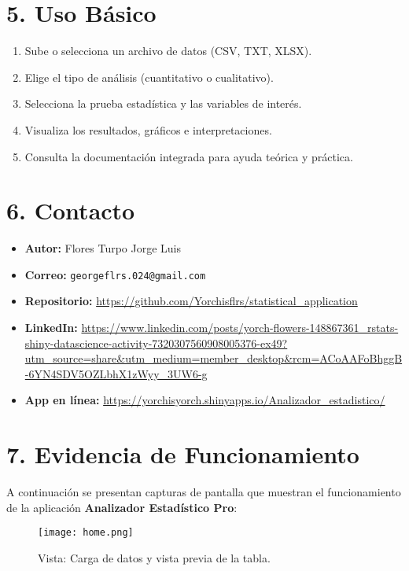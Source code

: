 \documentclass[12pt]{article}
\begin{document}
\section*{5. Uso Básico}
\begin{enumerate}
    \item Sube o selecciona un archivo de datos (CSV, TXT, XLSX).
    \item Elige el tipo de análisis (cuantitativo o cualitativo).
    \item Selecciona la prueba estadística y las variables de interés.
    \item Visualiza los resultados, gráficos e interpretaciones.
    \item Consulta la documentación integrada para ayuda teórica y práctica.
\end{enumerate}

\section*{6. Contacto}
\begin{itemize}
    \item \textbf{Autor:} Flores Turpo Jorge Luis
    \item \textbf{Correo:} \texttt{georgeflrs.024@gmail.com}
    \item \textbf{Repositorio:} \url{https://github.com/Yorchisflrs/statistical_application}
    \item \textbf{LinkedIn:} \url{https://www.linkedin.com/posts/yorch-flowers-148867361_rstats-shiny-datascience-activity-7320307560908005376-ex49?utm_source=share&utm_medium=member_desktop&rcm=ACoAAFoBhggB-6YN4SDV5OZLbhX1zWyy_3UW6-g}
    \item \textbf{App en línea:} \url{https://yorchisyorch.shinyapps.io/Analizador_estadistico/}
\end{itemize}

\section*{7. Evidencia de Funcionamiento}

A continuación se presentan capturas de pantalla que muestran el funcionamiento de la aplicación \textbf{Analizador Estadístico Pro}:

\begin{figure}[h!]
    \centering
    \texttt{[image: home.png]}
    \caption{Vista: Carga de datos y vista previa de la tabla.}
\end{figure}
\end{document}
